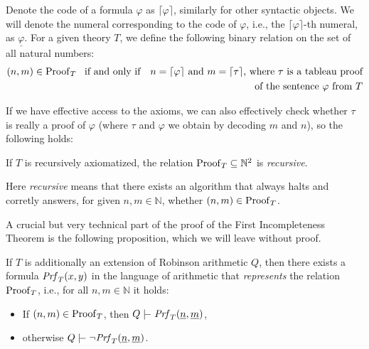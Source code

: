     Denote the code of a formula $\varphi$ as $\lceil\varphi\rceil$, similarly for other syntactic objects. We will denote the numeral corresponding to the code of $\varphi$, i.e., the $\lceil\varphi\rceil$-th numeral, as $\underline{\varphi}$. For a given theory $T$, we define the following binary relation on the set of all natural numbers:
    \begin{align*}
        (n,m)\in\Proof_T\ \text{ if and only if \ \ $n=\lceil\varphi\rceil$ and $m=\lceil\tau\rceil$, where $\tau$ is a tableau proof} \\ \text{of the sentence $\varphi$ from $T$}    
    \end{align*}
   
    If we have effective access to the axioms, we can also effectively check whether $\tau$ is really a proof of $\varphi$ (where $\tau$ and $\varphi$ we obtain by decoding $m$ and $n$), so the following holds:
    \begin{observation}
    If $T$ is recursively axiomatized, the relation $\operatorname{Proof}_T\subseteq\mathbb N^2$ is \emph{recursive}.
    \end{observation}
    Here \emph{recursive} means that there exists an algorithm that always halts and corretly answers, for given $n,m\in\mathbb N$, whether $(n,m)\in\operatorname{Proof}_T$.
    
    A crucial but very technical part of the proof of the First Incompleteness Theorem is the following proposition, which we will leave without proof.
    
    \begin{proposition}
    If $T$ is additionally an extension of Robinson arithmetic $Q$, then there exists a formula $\mathit{Prf}_T(x,y)$ in the language of arithmetic that \emph{represents} the relation $\operatorname{Proof}_T$, i.e., for all $n,m\in\mathbb N$ it holds:
    \begin{itemize}
        \item If $(n,m)\in\operatorname{Proof}_T$, then $Q\proves\Prf_T(\underline{n},\underline{m})$,
        \item otherwise $Q\proves\neg\Prf_T(\underline{n},\underline{m})$.
    \end{itemize} 
    \end{proposition}
    
